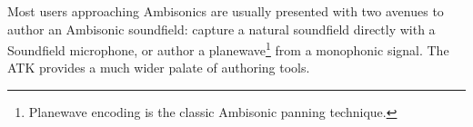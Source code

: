 \documentclass{article}
\begin{document}
%

Most users approaching Ambisonics are usually presented with two avenues to author an Ambisonic soundfield: capture a natural soundfield directly with a Soundfield microphone, or author a planewave\footnote{Planewave encoding is the classic Ambisonic panning technique.} from a monophonic signal.
The ATK provides a much wider palate of authoring tools.
\end{document}
